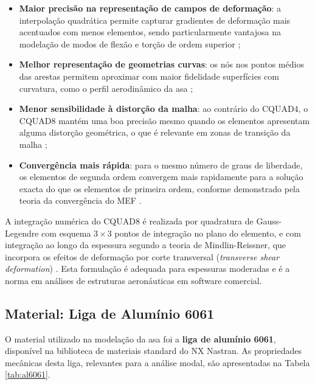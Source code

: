 \documentclass[11pt,twoside,a4paper]{report}
\begin{document}
\begin{itemize}
    \item \textbf{Maior precisão na representação de campos de deformação}: a interpolação quadrática permite capturar gradientes de deformação mais acentuados com menos elementos, sendo particularmente vantajosa na modelação de modos de flexão e torção de ordem superior \cite{Bathe2014};

    \item \textbf{Melhor representação de geometrias curvas}: os nós nos pontos médios das arestas permitem aproximar com maior fidelidade superfícies com curvatura, como o perfil aerodinâmico da asa \cite{Zienkiewicz2005};

    \item \textbf{Menor sensibilidade à distorção da malha}: ao contrário do CQUAD4, o CQUAD8 mantém uma boa precisão mesmo quando os elementos apresentam alguma distorção geométrica, o que é relevante em zonas de transição da malha \cite{Cook2001};

    \item \textbf{Convergência mais rápida}: para o mesmo número de graus de liberdade, os elementos de segunda ordem convergem mais rapidamente para a solução exacta do que os elementos de primeira ordem, conforme demonstrado pela teoria da convergência do MEF \cite{Bathe2014}.
\end{itemize}

A integração numérica do CQUAD8 é realizada por quadratura de Gauss-Legendre com esquema $3 \times 3$ pontos de integração no plano do elemento, e com integração ao longo da espessura segundo a teoria de Mindlin-Reissner, que incorpora os efeitos de deformação por corte transversal (\textit{transverse shear deformation}) \cite{Nastran2014}. Esta formulação é adequada para espessuras moderadas e é a norma em análises de estruturas aeronáuticas em software comercial.

\subsection{Material: Liga de Alumínio 6061}

O material utilizado na modelação da asa foi a \textbf{liga de alumínio 6061}, disponível na biblioteca de materiais standard do NX Nastran. As propriedades mecânicas desta liga, relevantes para a análise modal, são apresentadas na Tabela \ref{tab:al6061}.
\end{document}
